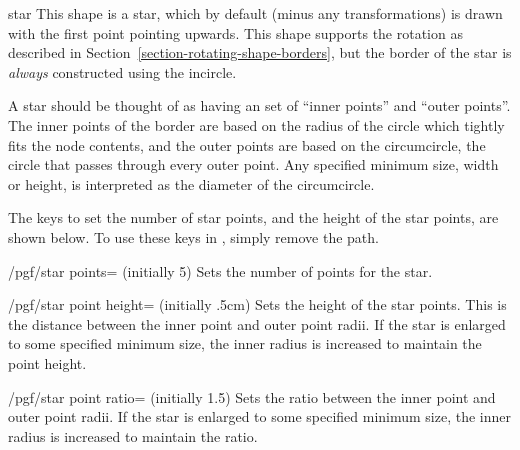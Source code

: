 \begin{shape}{star}
  This shape is a star, which by default (minus any transformations) is
  drawn with the first point pointing upwards.
  This shape supports the rotation as described in
  Section~\ref{section-rotating-shape-borders}, but the border of the
  star is \emph{always} constructed using the incircle.

  A star should be thought of as having an set of ``inner points''
  and ``outer points''.
  The inner points of the border are based on the radius of the circle
  which tightly fits the node contents, and the outer points are based
  on the circumcircle, the circle that passes through every outer
  point.
  Any specified minimum size, width or height, is interpreted as the
  diameter of the circumcircle.

\begin{codeexample}[]
\end{codeexample}

  The \pgfname{} keys to set the number of star points, and the height
  of the star points, are shown below. To use these keys in \tikzname,
  simply remove the  path.

  \begin{key}{/pgf/star points= (initially 5)}
    Sets the number of points for the star.
  \end{key}

  \begin{key}{/pgf/star point height= (initially .5cm)}
    Sets the height of the star points. This is the distance between the
    inner point and outer point radii. If the star is enlarged to some
    specified minimum size, the inner radius is increased to maintain
    the point height.	
  \end{key}

  \begin{key}{/pgf/star point ratio= (initially 1.5)}
    Sets the ratio between the inner point and outer point radii.		
    If the star is enlarged to some specified minimum size, the
    inner radius is increased to maintain the ratio.	
  \end{key}


\end{shape}
